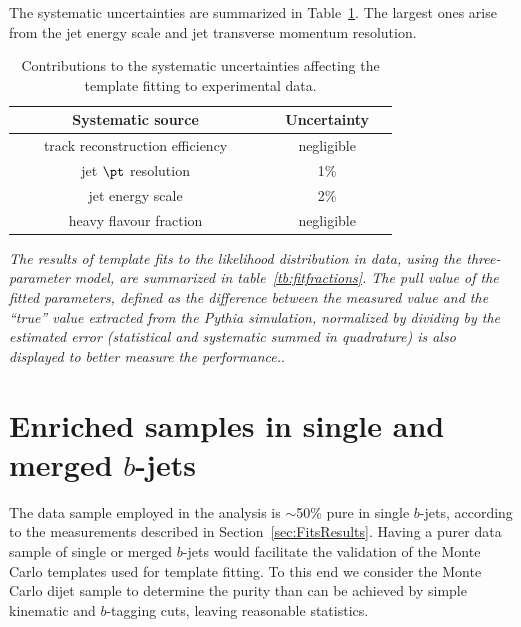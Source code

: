 The systematic uncertainties are summarized in Table~\ref{tb:systematicsfits}. The largest ones arise from the jet energy scale and jet transverse momentum resolution.
\begin{table}[!hbt] %
\renewcommand{\arraystretch}{1.2}
\centering
\begin{tabular}{ | c | c |}
\hline
  ~~~~~~~Systematic source~~~~~~~ &~~Uncertainty~~\\ \hline
  track reconstruction efficiency  &    negligible        \\ 
  jet $\pt$ resolution  &    1\%        \\  
  jet energy scale  &    2\%        \\ 
  heavy flavour fraction  &    negligible        \\ \hline 
\end{tabular}
\caption{Contributions to the systematic uncertainties affecting the template fitting to experimental data.}
\label{tb:systematicsfits}
\end{table}

\emph{The results of template fits to the likelihood distribution in data, using the three-parameter model, are summarized in table~\ref{tb:fitfractions}. The pull value of the fitted parameters, defined as the difference between the measured value and the ``true'' value extracted from the {\sc Pythia} simulation, normalized by dividing by the estimated error (statistical and systematic summed in quadrature) is also displayed to better measure the performance.}.


\section{Enriched samples in single and merged $b$-jets}\label{sec:Enriched}

The data sample employed in the analysis is $\sim$50\% pure in single $b$-jets, according to the measurements described in Section~\ref{sec:FitsResults}. Having a purer data sample of single or  merged $b$-jets would facilitate the validation of the Monte Carlo templates used for template fitting. To this end we consider the Monte Carlo dijet sample to determine the purity than can be achieved by simple kinematic and $b$-tagging cuts, leaving reasonable statistics.

